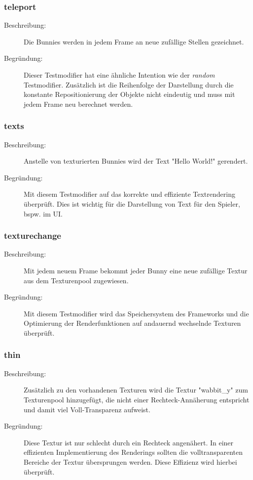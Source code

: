 \subsubsection{teleport}
\begin{description}
\item[Beschreibung:] Die Bunnies werden in jedem Frame an neue zufällige Stellen gezeichnet. \\
\item[Begründung:] Dieser Testmodifier hat eine ähnliche Intention wie der \emph{random} Testmodifier. Zusätzlich ist die Reihenfolge der Darstellung durch die konstante Repositionierung der Objekte nicht eindeutig und muss mit jedem Frame neu berechnet werden.
\end{description}

\subsubsection{texts}
\begin{description}
\item[Beschreibung:] Anstelle von texturierten Bunnies wird der Text "Hello World!" gerendert. \\
\item[Begründung:] Mit diesem Testmodifier auf das korrekte und effiziente Textrendering überprüft. Dies ist wichtig für die Darstellung von Text für den Spieler, bspw. im UI.
\end{description}

\subsubsection{texturechange}
\begin{description}
\item[Beschreibung:] Mit jedem neuem Frame bekommt jeder Bunny eine neue zufällige Textur aus dem Texturenpool zugewiesen. \\
\item[Begründung:] Mit diesem Testmodifier wird das Speichersystem des Frameworks und die Optimierung der Renderfunktionen auf andauernd wechselnde Texturen überprüft.
\end{description}

\subsubsection{thin}
\begin{description}
\item[Beschreibung:] Zusätzlich zu den vorhandenen Texturen wird die Textur "wabbit\_y" zum Texturenpool hinzugefügt, die nicht einer Rechteck-Annäherung entspricht und damit viel Voll-Transparenz aufweist. \\
\item[Begründung:] Diese Textur ist nur schlecht durch ein Rechteck angenähert. In einer effizienten Implementierung des Renderings sollten die volltransparenten Bereiche der Textur übersprungen werden. Diese Effizienz wird hierbei überprüft.
\end{description}

